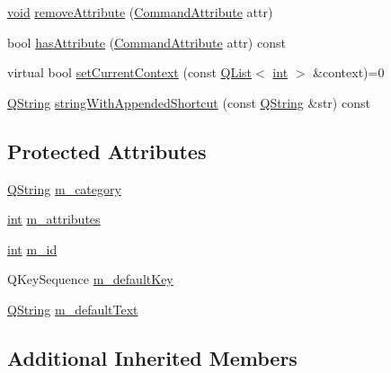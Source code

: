 \begin{DoxyCompactItemize}
\item 
\hyperlink{group___u_a_v_objects_plugin_ga444cf2ff3f0ecbe028adce838d373f5c}{void} \hyperlink{group___core_plugin_gaf93160aaab64518efe208d5b7e674f05}{remove\-Attribute} (\hyperlink{group___core_plugin_ga4d899c1f711159a432afeab3eb78c917}{Command\-Attribute} attr)
\item 
bool \hyperlink{group___core_plugin_ga3a7cc9955526f08640f232578c1dff74}{has\-Attribute} (\hyperlink{group___core_plugin_ga4d899c1f711159a432afeab3eb78c917}{Command\-Attribute} attr) const 
\item 
virtual bool \hyperlink{group___core_plugin_ga7e93a5c0eeb452e6521b2226f8f6c0b1}{set\-Current\-Context} (const \hyperlink{class_q_list}{Q\-List}$<$ \hyperlink{ioapi_8h_a787fa3cf048117ba7123753c1e74fcd6}{int} $>$ \&context)=0
\item 
\hyperlink{group___u_a_v_objects_plugin_gab9d252f49c333c94a72f97ce3105a32d}{Q\-String} \hyperlink{group___core_plugin_gae13875281dec49fa636de5062ee529df}{string\-With\-Appended\-Shortcut} (const \hyperlink{group___u_a_v_objects_plugin_gab9d252f49c333c94a72f97ce3105a32d}{Q\-String} \&str) const 
\end{DoxyCompactItemize}
\subsection*{Protected Attributes}
\begin{DoxyCompactItemize}
\item 
\hyperlink{group___u_a_v_objects_plugin_gab9d252f49c333c94a72f97ce3105a32d}{Q\-String} \hyperlink{group___core_plugin_gaaf7dc3b2670761aed9b0fcd72e26e3de}{m\-\_\-category}
\item 
\hyperlink{ioapi_8h_a787fa3cf048117ba7123753c1e74fcd6}{int} \hyperlink{group___core_plugin_gab044af6a24be070e1768de73d42fc061}{m\-\_\-attributes}
\item 
\hyperlink{ioapi_8h_a787fa3cf048117ba7123753c1e74fcd6}{int} \hyperlink{group___core_plugin_ga73ea1412ce25f01d64a6abae17e5231d}{m\-\_\-id}
\item 
Q\-Key\-Sequence \hyperlink{group___core_plugin_ga052270796043a63f83fe558ce4ad9527}{m\-\_\-default\-Key}
\item 
\hyperlink{group___u_a_v_objects_plugin_gab9d252f49c333c94a72f97ce3105a32d}{Q\-String} \hyperlink{group___core_plugin_ga6cab8c588b096399add5878601b7c485}{m\-\_\-default\-Text}
\end{DoxyCompactItemize}
\subsection*{Additional Inherited Members}


